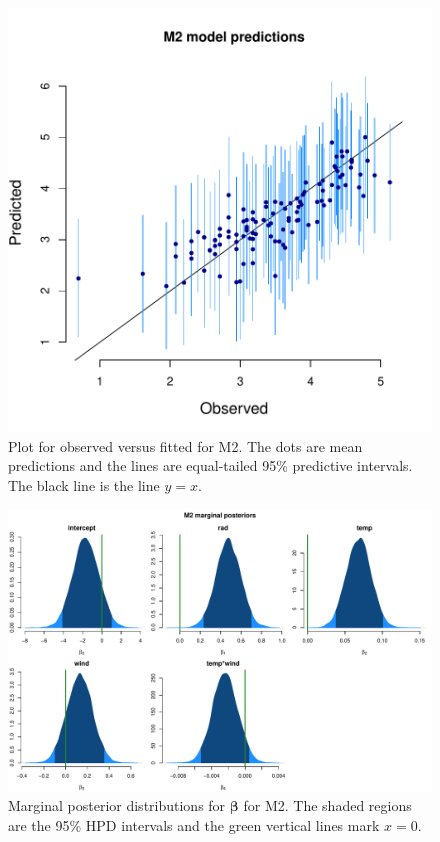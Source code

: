 \documentclass{asaproc}
\newcommand{\m}[1]{\mathbf{\bm{#1}}}
\begin{document}
\begin{figure}
\centering
\includegraphics[scale=0.53]{figs/pred_obsfit_2.pdf}
\caption{Plot for observed versus fitted for M2. The dots are mean predictions and the lines are equal-tailed 95\% predictive intervals. The black line is the line $y=x$.}
\label{obsfit2}
\end{figure}

\begin{figure}
\centering
\includegraphics[scale=0.40]{figs/post_2.pdf}
\caption{Marginal posterior distributions for $\m{\beta}$ for M2. The shaded regions are the 95\% HPD intervals and the green vertical lines mark $x=0$.}
\label{post2}
\end{figure}
\end{document}

